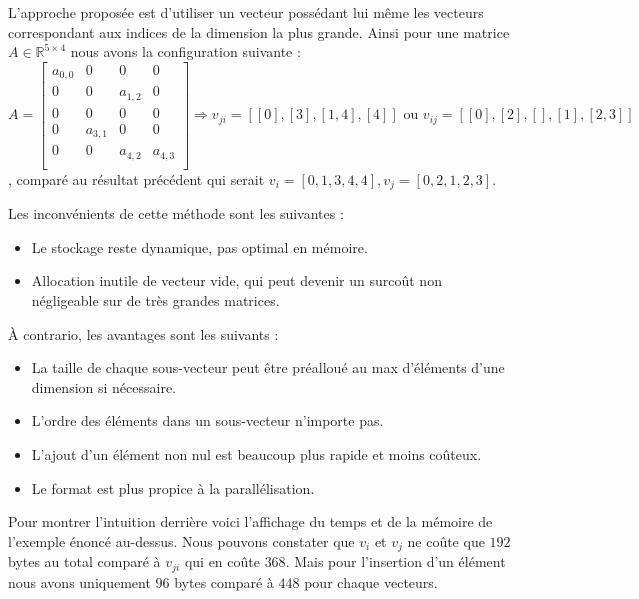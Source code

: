 L'approche proposée est d'utiliser un vecteur possédant lui même les vecteurs
correspondant aux indices de la dimension la plus grande. Ainsi pour une
matrice $A\in \mathbb{R}^{5\times 4}$ nous avons la configuration suivante : $$
    A =
    \begin{bmatrix}
        a_{0,0} & 0       & 0       & 0       \\
        0       & 0       & a_{1,2} & 0       \\
        0       & 0       & 0       & 0       \\
        0       & a_{3,1} & 0       & 0       \\
        0       & 0       & a_{4,2} & a_{4,3} \\
    \end{bmatrix}
    \Rightarrow
    v_{ji} = [[0],[3],[1,4],[4]] \text{ ou } v_{ij} = [[0],[2],[],[1],[2,3]]
$$,
comparé au résultat précédent qui serait $v_i = [0,1,3,4,4], v_j = [0,2,1,2,3]$.

Les inconvénients de cette méthode sont les suivantes :
\begin{itemize}
    \item Le stockage reste dynamique, pas optimal en mémoire.
    \item Allocation inutile de vecteur vide, qui peut devenir un surcoût non négligeable
          sur de très grandes matrices.
\end{itemize}
À contrario, les avantages sont les suivants :
\begin{itemize}
    \item La taille de chaque sous-vecteur peut être préalloué au max d'éléments d'une
          dimension si nécessaire.
    \item L'ordre des éléments dans un sous-vecteur n'importe pas.
    \item L'ajout d'un élément non nul est beaucoup plus rapide et moins coûteux.
    \item Le format est plus propice à la parallélisation.
\end{itemize}

Pour montrer l'intuition derrière voici l'affichage du temps et de la mémoire
de l'exemple énoncé au-dessus. Nous pouvons constater que $v_i$ et $v_j$ ne
coûte que $192$ bytes au total comparé à $v_{ji}$ qui en coûte $368$. Mais pour
l'insertion d'un élément nous avons uniquement $96$ bytes comparé à $448$ pour
chaque vecteurs.

